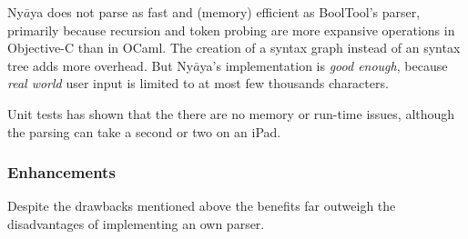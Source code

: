 Ny$\bar{a}$ya does not parse as fast and (memory) efficient as BoolTool's parser,
primarily because recursion and token probing are more expansive operations in Objective-C than in OCaml.
The creation of a syntax graph instead of an syntax tree adds more overhead.
But Ny$\bar{a}$ya's implementation is {\em good enough}, 
because {\em real world} user input is limited to at most few thousands characters.

Unit tests has shown that the there are no memory or run-time issues, 
although the parsing can take a second or two on an iPad.

\subsubsection{Enhancements}

Despite the drawbacks mentioned above
the benefits far outweigh the disadvantages of implementing an own parser.

